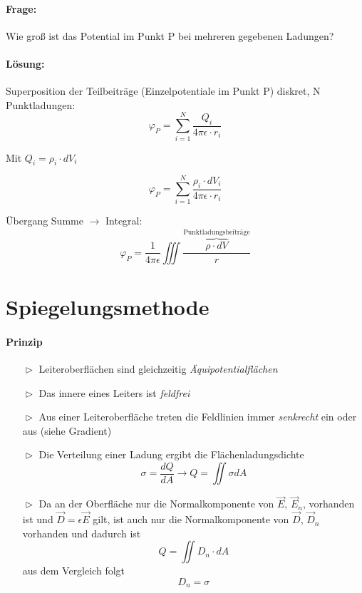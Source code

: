 \documentclass[11pt, a4paper]{article}
\begin{document}
\paragraph{Frage:} Wie groß ist das Potential im Punkt P bei mehreren gegebenen Ladungen? \paragraph{Lösung:} Superposition der Teilbeiträge (Einzelpotentiale im Punkt P)
diskret, N Punktladungen:
\[\varphi_{P} = \sum_{i=1}^{N}{ \frac{Q_{i}}{4\pi \epsilon \cdot r_{i}} }\]

Mit $Q_{i} = \rho_{i} \cdot dV_{i}$

\[\varphi_{P} = \sum_{i=1}^{N}{ \frac{\rho_{i} \cdot dV_{i}}{4\pi \epsilon \cdot r_{i}} }\]

Übergang Summe $\rightarrow$ Integral:
\[\varphi_{P} = \frac{1}{4\pi\epsilon} \iiint{\frac{\overbrace{\rho \cdot dV}^{\text{Punktladungsbeiträge}}}{r}}\]




\section{Spiegelungsmethode}
\paragraph{Prinzip}
\begin{itemize}
  \item[$\vartriangleright$] Leiteroberflächen sind gleichzeitig \emph{Äquipotentialflächen}
  \item[$\vartriangleright$] Das innere eines Leiters ist \emph{feldfrei}
  \item[$\vartriangleright$] Aus einer Leiteroberfläche treten die Feldlinien immer \emph{senkrecht} ein oder aus (siehe Gradient)
  \item[$\vartriangleright$] Die Verteilung einer Ladung ergibt die Flächenladungsdichte \[\sigma  = \frac{dQ}{dA} \rightarrow Q = \iint{\sigma dA}\]
  \item[$\vartriangleright$] Da an der Oberfläche nur die Normalkomponente von $\vec{E}$, $\vec{E}_{n}$, vorhanden ist und $\vec{D} = \epsilon \vec{E}$ gilt, ist auch nur die Normalkomponente von $\vec{D}$, $\vec{D}_{n}$ vorhanden und dadurch ist
  \[Q = \iint{D_{n} \cdot dA}\]
  aus dem Vergleich folgt
  \[D_{n} = \sigma\]
\end{itemize}
\end{document}
